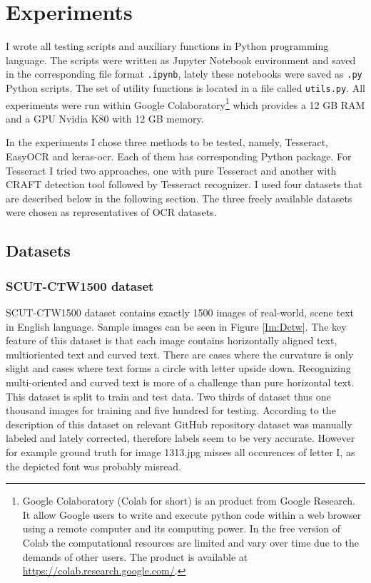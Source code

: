 \chapter{Experiments}
\label{ch:testing}
I wrote all testing scripts and auxiliary functions in Python programming language. The scripts were written as Jupyter Notebook environment and saved in the corresponding file format \texttt{.ipynb}, lately these notebooks were saved as \texttt{.py} Python scripts. The set of utility functions is located in a file called \texttt{utils.py}. All experiments were run within Google Colaboratory\footnote{Google Colaboratory (Colab for short) is an product from Google Research. It allow Google users to write and execute python code within a web browser using a remote computer and its computing power. In the free version of Colab the computational resources are limited and vary over time due to the demands of other users. The product is available at \url{https://colab.research.google.com/}.} which provides a 12 GB RAM and a GPU Nvidia K80 with 12 GB memory.

In the experiments I chose three methods to be tested, namely, Tesseract, EasyOCR and keras-ocr. Each of them has corresponding Python package. For Tesseract I tried two approaches, one with pure Tesseract and another with CRAFT detection tool followed by Tesseract recognizer. I used four datasets that are described below in the following section. The three freely available datasets were chosen as representatives of OCR datasets.

\section{Datasets}
\label{sec:expDatasets}

\subsection{SCUT-CTW1500 dataset}

SCUT-CTW1500 dataset contains exactly 1500 images of real-world, scene text in English language. Sample images can be seen in Figure \ref*{Im:Dctw}. The key feature of this dataset is that each image contains horizontally aligned text, multioriented text and curved text. There are cases where the curvature is only slight and cases where text forms a circle with letter upside down. Recognizing multi-oriented and curved text is more of a challenge than pure horizontal text. This dataset is split to train and test data. Two thirds of dataset thus one thousand images for training and five hundred for testing. According to the description of this dataset on relevant GitHub repository dataset was manually labeled and lately corrected, therefore labels seem to be very accurate. However for example ground truth for image 1313.jpg misses all occurences of letter I, as the depicted font was probably misread.\cite{ctw,ctw2}

